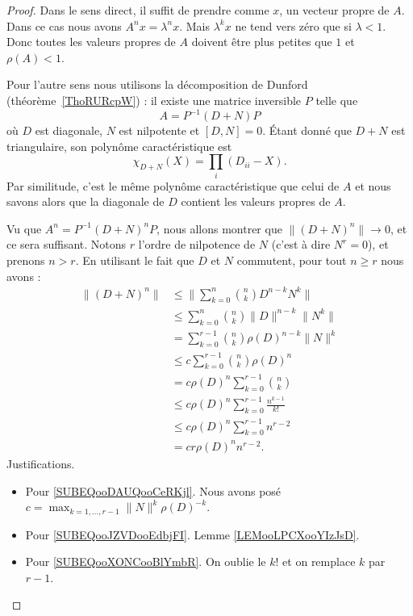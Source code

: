 \begin{proof}
	Dans le sens direct, il suffit de prendre comme \( x\), un vecteur propre de \( A\). Dans ce cas nous avons \( A^nx=\lambda^nx\). Mais \( \lambda^kx\) ne tend vers zéro que si \( \lambda<1\). Donc toutes les valeurs propres de \( A\) doivent être plus petites que \( 1\) et \( \rho(A)<1\).

	Pour l'autre sens nous utilisons la décomposition de Dunford (théorème~\ref{ThoRURcpW}) : il existe une matrice inversible \( P\) telle que
	\begin{equation}
		A=P^{-1}(D+N)P
	\end{equation}
	où \( D\) est diagonale, \( N\) est nilpotente et \( [D,N]=0\). Étant donné que \( D+N\) est triangulaire, son polynôme caractéristique est
	\begin{equation}
		\chi_{D+N}(X)=\prod_i( D_{ii}-X).
	\end{equation}
	Par similitude, c'est le même polynôme caractéristique que celui de \( A\) et nous savons alors que la diagonale de \( D\) contient les valeurs propres de \( A\).

	Vu que \( A^n=P^{-1}(D+N)^nP\), nous allons montrer que \( \| (D+N)^n \|\to 0\), et ce sera suffisant. Notons \( r\) l'ordre de nilpotence de \( N\) (c'est à dire \( N^r=0\)), et prenons \( n>r\). En utilisant le fait que \( D\) et \( N\) commutent, pour tout \( n\geq r\) nous avons :
	\begin{subequations}
		\begin{align}
			\| (D+N)^n \| & \leq \| \sum_{k=0}^n\binom{ n }{ k }D^{n-k}N^k \|                                   \\
			              & \leq \sum_{k=0}^n\binom{ n }{ k }\| D \|^{n-k}\| N^k \|                             \\
			              & =\sum_{k=0}^{r-1}\binom{ n }{ k }\rho(D)^{n-k}\| N \|^k                             \\
			              & \leq c\sum_{k=0}^{r-1}\binom{ n }{ k }\rho(D)^n \label{SUBEQooDAUQooCeRKjl}         \\
			              & =c\rho(D)^n\sum_{k=0}^{r-1}\binom{ n }{ k }                                         \\
			              & \leq c\rho(D)^n\sum_{k=0}^{r-1}\frac{ n^{k-1} }{ k! }   \label{SUBEQooJZVDooEdbjFI} \\
			              & \leq c\rho(D)^n\sum_{k=0}^{r-1}n^{r-2}  \label{SUBEQooXONCooBlYmbR}                 \\
			              & =cr\rho(D)^nn^{r-2}.
		\end{align}
	\end{subequations}
	Justifications.
	\begin{itemize}
		\item Pour \eqref{SUBEQooDAUQooCeRKjl}. Nous avons posé \( c=\max_{k=1,\ldots, r-1}\| N \|^k\rho(D)^{-k}\).
		\item Pour \eqref{SUBEQooJZVDooEdbjFI}. Lemme \ref{LEMooLPCXooYIzJsD}.
		\item Pour \eqref{SUBEQooXONCooBlYmbR}. On oublie le \( k!\) et on remplace \( k\) par \( r-1\).
	\end{itemize}


\end{proof}
